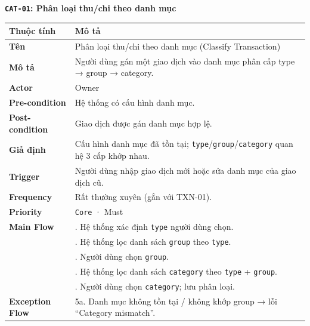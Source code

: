 \documentclass[11pt,a4paper]{article}
\newcounter{none}
\newcommand{\faintline}{%
  \noalign{\global\arrayrulecolor{faintgray}}%
  \hline
  \noalign{\global\arrayrulecolor{black}}%
} %
\begin{document}
\textbf{\texttt{CAT-01}: Phân loại thu/chi theo danh mục}

{\def\LTcaptype{none}
\begin{longtable}[]{@{}
  >{\raggedright\arraybackslash}p{}
  >{\raggedright\arraybackslash}p{}@{}}
\toprule\noalign{}
\begin{minipage}[b]{\linewidth}\raggedright
Thuộc tính
\end{minipage} & \begin{minipage}[b]{\linewidth}\raggedright
Mô tả
\end{minipage} \\
\midrule\noalign{}
\endhead
\bottomrule\noalign{}
\endlastfoot
\textbf{Tên} & Phân loại thu/chi theo danh mục (Classify Transaction) \\ \faintline
\textbf{Mô tả} & Người dùng gán một giao dịch vào danh mục phân cấp type → group → category. \\ \faintline
\textbf{Actor} & Owner \\ \faintline
\textbf{Pre-condition} & Hệ thống có cấu hình danh mục. \\ \faintline
\textbf{Post-condition} & Giao dịch được gán danh mục hợp lệ. \\ \faintline
\textbf{Giả định} & Cấu hình danh mục đã tồn tại; \texttt{type}/\texttt{group}/\texttt{category} quan hệ 3 cấp khớp nhau. \\ \faintline
\textbf{Trigger} & Người dùng nhập giao dịch mới hoặc sửa danh mục của giao dịch cũ. \\ \faintline
\textbf{Frequency} & Rất thường xuyên (gắn với TXN-01). \\ \faintline
\textbf{Priority} & \texttt{Core} · Must \\ \faintline
\textbf{Main Flow} & 1. Hệ thống xác định \texttt{type} người dùng chọn.\\
&2. Hệ thống lọc danh sách \texttt{group} theo \texttt{type}.\\
&3. Người dùng chọn \texttt{group}.\\
&4. Hệ thống lọc danh sách \texttt{category} theo \texttt{type} + \texttt{group}.\\
&5. Người dùng chọn \texttt{category}; lưu phân loại. \\ \faintline
\textbf{Exception Flow} & 5a. Danh mục không tồn tại / không khớp group → lỗi ``Category mismatch''. \\
\end{longtable}
}
\end{document}
